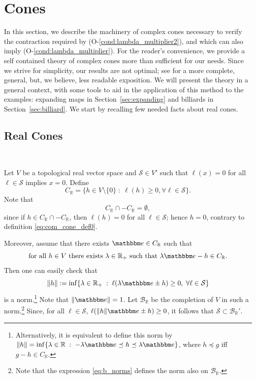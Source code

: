\documentclass{amsart}
\numberwithin{equation}{section}
\newcommand\cB{{\mathcal B}}
\newcommand\cS{{\mathcal S}}
\newcommand\bR{{\mathbb R}}
\newcommand{\bbe}{\mathbbm e}
\begin{document}

\section{Cones}
\label{sec:complex}

In this section, we describe the machinery of complex cones necessary to verify the contraction
required by (O-\ref{cond:lambda_multiplier2}), and which can also imply (O-\ref{cond:lambda_multiplier}).  For the reader's convenience,
we provide a self contained theory of complex cones more than sufficient for our needs. 
Since we strive for simplicity, our results are not optimal; see \cite{Ru10, Du09} for a more complete, general, but, we believe, less readable exposition.
We will present the theory in a general context, with some tools to aid in the application of
this method to the examples: expanding maps in Section~\ref{sec:expanding} and billiards in Section~\ref{sec:billiard}.
We start by recalling few needed facts about real cones.


\subsection{Real Cones}\ \\
\label{sec:realcones}

Let $V$ be a topological real vector space and $\cS\in V'$ such that $\ell(x)=0$ for all $\ell\in\cS$ implies $x=0$. Define
\begin{equation}\label{eq:com_cone_def0}
C_\bR=\{h\in V\setminus \{0\}\;:\; \ell(h)\geq 0, \forall \ell\in\cS\}.
\end{equation}  
Note that
\begin{equation}\label{eq:no_seminorm}
C_{\bR}\cap-C_{\bR}=\emptyset,
\end{equation}
since if $h\in C_{\bR}\cap-C_{\bR}$, then $\ell(h)=0$ for all $\ell\in\cS$; hence $h=0$, contrary to definition \eqref{eq:com_cone_def0}.

Moreover, assume that there exists $\bbe\in C_\bR$ such that 
\begin{equation}
\label{eq:archimedean}
\mbox{for all $h\in  V$ there exists $\lambda\in\bR_+$ such that $\lambda\bbe-h\in C_\bR$.}
\end{equation}  
Then one can easily check that
\begin{equation}\label{eq:b_norms}
\| h \| :=\inf\{\lambda\in\bR_+\;:\; \ell(\lambda\bbe\pm h)\geq 0, \;\forall \ell \in \cS\}
\end{equation}
is a norm.\footnote{Alternatively, it is equivalent to define this norm by $\|h\|=\inf\{\lambda\in\bR\;:\; -\lambda \bbe\preceq h\preceq \lambda \bbe\}$, where $h\preceq g$ iff $g-h\in C_\bR $.} 
Note that $\| \bbe \| = 1$.
 Let $\cB_\bR$ be the completion of $V$ in such a norm.\footnote{ Note that the expression \eqref{eq:b_norms} defines the norm also on $\cB_\bR$.} Since, for all $\ell\in \cS$, $\ell(\|h\|\bbe\pm h)\geq 0$, it follows that $\cS\subset \cB_\bR'$.
\end{document}
